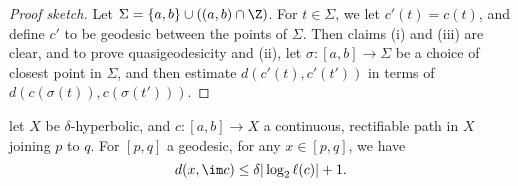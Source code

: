 \documentclass[a4paper]{article}
\begin{document}
\begin{proof}[Proof sketch]
  Let $\Sigma = \{a, b\} \cup ((a, b) \cap \Z)$. For $t \in \Sigma$, we let $c'(t) = c(t)$, and define $c'$ to be geodesic between the points of $\Sigma$. Then claims (i) and (iii) are clear, and to prove quasigeodesicity and (ii), let $\sigma: [a, b] \to \Sigma$ be a choice of closest point in $\Sigma$, and then estimate $d(c'(t), c'(t'))$ in terms of $d(c(\sigma(t)), c(\sigma(t')))$.
\end{proof}

\begin{lemma}
  let $X$ be $\delta$-hyperbolic, and $c: [a, b] \to X$ a continuous, rectifiable path in $X$ joining $p$ to $q$. For $[p, q]$ a geodesic, for any $x \in [p, q]$, we have
  \[
    d(x, \im c) \leq \delta |\log_2\ell(c)| + 1.
  \]
\end{lemma}
\end{document}
